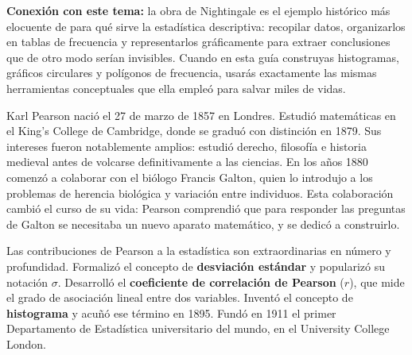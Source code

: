 \documentclass[11pt, letterpaper]{article}
\begin{document}
\begin{tcolorbox}
\begin{minipage}[t]{0.78\linewidth}
\medskip
\textbf{Conexión con este tema:} la obra de Nightingale es el ejemplo histórico más elocuente de para qué sirve la estadística descriptiva: recopilar datos, organizarlos en tablas de frecuencia y representarlos gráficamente para extraer conclusiones que de otro modo serían invisibles. Cuando en esta guía construyas histogramas, gráficos circulares y polígonos de frecuencia, usarás exactamente las mismas herramientas conceptuales que ella empleó para salvar miles de vidas.
\end{minipage}

\end{tcolorbox}

\vspace{0.65cm}

\begin{tcolorbox}[enhanced, breakable,
  colback=white, colframe=blockc, colbacktitle=blockc,
  coltitle=white, arc=4pt, leftrule=5pt,
  left=10pt, right=10pt, top=12pt, bottom=10pt,
  fonttitle=\bfseries,
  attach boxed title to top left={xshift=0.5cm, yshift*=-\tcboxedtitleheight/2},
  boxed title style={colframe=blockc, colback=blockc, arc=2pt},
  title={Karl Pearson \hfill \normalfont\itshape 1857 --- 1936}]

\begin{minipage}[t]{0.78\linewidth}
\vspace{0pt}

Karl Pearson nació el 27 de marzo de 1857 en Londres. Estudió matemáticas en el King's College de Cambridge, donde se graduó con distinción en 1879. Sus intereses fueron notablemente amplios: estudió derecho, filosofía e historia medieval antes de volcarse definitivamente a las ciencias. En los años 1880 comenzó a colaborar con el biólogo Francis Galton, quien lo introdujo a los problemas de herencia biológica y variación entre individuos. Esta colaboración cambió el curso de su vida: Pearson comprendió que para responder las preguntas de Galton se necesitaba un nuevo aparato matemático, y se dedicó a construirlo.

\medskip
Las contribuciones de Pearson a la estadística son extraordinarias en número y profundidad. Formalizó el concepto de \textbf{desviación estándar} y popularizó su notación $\sigma$. Desarrolló el \textbf{coeficiente de correlación de Pearson} ($r$), que mide el grado de asociación lineal entre dos variables. Inventó el concepto de \textbf{histograma} y acuñó ese término en 1895. Fundó en 1911 el primer Departamento de Estadística universitario del mundo, en el University College London.


\end{minipage}
\end{tcolorbox}
\end{document}
